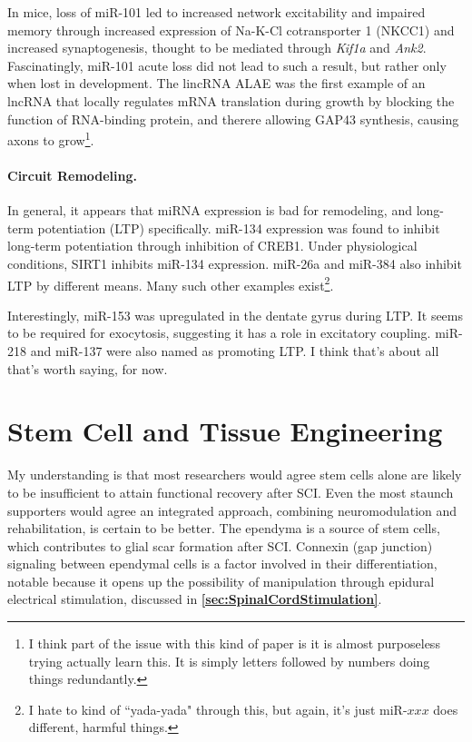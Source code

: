 \documentclass[12pt]{report}
\begin{document}
In mice, loss of miR-101 led to increased network excitability and impaired memory through increased expression of Na-K-Cl cotransporter 1 (NKCC1) and increased synaptogenesis, thought to be mediated through \textit{Kif1a} and \textit{Ank2}. Fascinatingly, miR-101 acute loss did not lead to such a result, but rather only when lost in development. The lincRNA ALAE was the first example of an lncRNA that locally regulates mRNA translation during growth by blocking the function of RNA-binding protein, and therere allowing GAP43 synthesis, causing axons to grow\footnote{I think part of the issue with this kind of paper is it is almost purposeless trying actually learn this. It is simply letters followed by numbers doing things redundantly.}.\newline

\subsubsection{Circuit Remodeling.}

In general, it appears that miRNA expression is bad for remodeling, and long-term potentiation (LTP) specifically. miR-134 expression was found to inhibit long-term potentiation through inhibition of CREB1. Under physiological conditions, SIRT1 inhibits miR-134 expression. miR-26a and miR-384 also inhibit LTP by different means. Many such other examples exist\footnote{I hate to kind of ``yada-yada" through this, but again, it's just miR-$xxx$ does different, harmful things.}.\newline

Interestingly, miR-153 was upregulated in the dentate gyrus during LTP. It seems to be required for exocytosis, suggesting it has a role in excitatory coupling. miR-218 and miR-137 were also named as promoting LTP. I think that's about all that's worth saying, for now. 









\chapter{Stem Cell and Tissue Engineering}

\label{sec:Stem-Cells}


My understanding is that most researchers would agree stem cells alone are likely to be insufficient to attain functional recovery after SCI. Even the most staunch supporters would agree an integrated approach, combining neuromodulation and rehabilitation, is certain to be better. The ependyma is a source of stem cells, which contributes to glial scar formation after SCI. Connexin (gap junction) signaling between ependymal cells is a factor involved in their differentiation, notable because it opens up the possibility of manipulation through epidural electrical stimulation, discussed in \textbf{\ref{sec:SpinalCordStimulation}}.\newline
\end{document}
